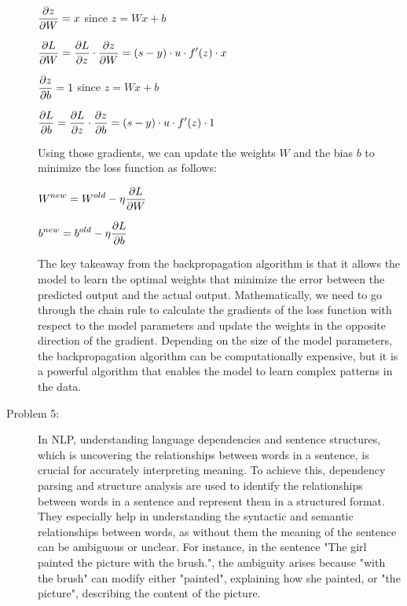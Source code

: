 \documentclass[12pt]{article}
\begin{document}
\begin{description}
  \begin{center}
    $\displaystyle{\pdv{z}{W} = x}$ since $z = Wx + b$

    $\displaystyle{\pdv{L}{W} = \pdv{L}{z} \cdot \pdv{z}{W} = (s - y) \cdot u \cdot f'(z) \cdot x}$

    $\displaystyle{\pdv{z}{b} = 1}$ since $z = Wx + b$

    $\displaystyle{\pdv{L}{b} = \pdv{L}{z} \cdot \pdv{z}{b} = (s - y) \cdot u \cdot f'(z) \cdot 1}$
  \end{center}

  Using those gradients, we can update the weights $W$ and the bias $b$ to minimize the loss function as follows:

  \begin{center}
    $\displaystyle{W^{new} = W^{old} - \eta \pdv{L}{W}}$

    $\displaystyle{b^{new} = b^{old} - \eta \pdv{L}{b}}$
  \end{center}

  The key takeaway from the backpropagation algorithm is that it allows the model to learn the optimal weights that minimize the error between the predicted output and the actual output.
  Mathematically, we need to go through the chain rule to calculate the gradients of the loss function with respect to the model parameters and update the weights in the opposite direction of the gradient.
  Depending on the size of the model parameters, the backpropagation algorithm can be computationally expensive, but it is a powerful algorithm that enables the model to learn complex patterns in the data.

  \pagebreak

  \item[Problem 5:] \hfill %
  
  In NLP, understanding language dependencies and sentence structures, which is uncovering the relationships between words in a sentence, is crucial for accurately interpreting
  meaning. To achieve this, dependency parsing and structure analysis are used to identify the relationships between words in a sentence and represent them in a structured format.
  They especially help in understanding the syntactic and semantic relationships between words, as without them the meaning of the sentence can be ambiguous or unclear. For 
  instance, in the sentence "The girl painted the picture with the brush.", the ambiguity arises because "with the brush" can modify either "painted", explaining how she painted,
  or "the picture", describing the content of the picture.


\end{description}
\end{document}
